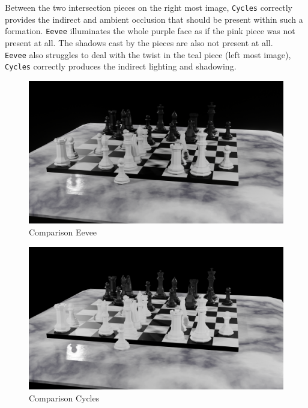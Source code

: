 \documentclass[11pt]{article}
\begin{document}
Between the two intersection pieces on the right most image, \texttt{Cycles} correctly
provides the indirect and ambient occlusion that should be present within such a
formation. \texttt{Eevee} illuminates the whole purple face as if the pink piece was
not present at all. The shadows cast by the pieces are also not present at
all.\\

\texttt{Eevee} also struggles to deal with the twist in the teal piece (left most
image), \texttt{Cycles} correctly produces the indirect lighting and shadowing.
\begin{figure}[htbp]
\centering
\includegraphics[width=\textwidth]{Images/reflections-eevee.png}
\caption{\label{reflections-eevee}Comparison Eevee}
\end{figure}

\begin{figure}[htbp]
\centering
\includegraphics[width=\textwidth]{Images/reflections-cycles.png}
\caption{\label{reflections-cycles}Comparison Cycles}
\end{figure}
\end{document}
